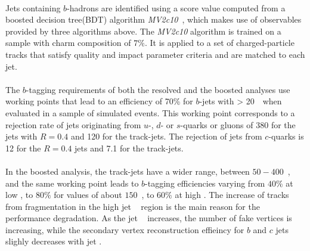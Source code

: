 \paragraph{}
Jets containing $b$-hadrons are identified using a score value computed from a boosted decision tree(BDT) algorithm \emph{MV2c10}~\cite{btaggingRun2, Aad:2015ydr}, which makes use of observables provided by three algorithms above. The \emph{MV2c10} algorithm is trained on a sample with charm composition of $7\%$. It is applied to a set of charged-particle tracks that satisfy quality and impact parameter criteria and are matched to each jet. 

\paragraph{}
The $b$-tagging requirements of both the resolved and the boosted analyses use working points that lead to an efficiency of 70\% for $b$-jets with \pt > 20~\GeV\ when evaluated in a sample of simulated \ttbar events. This working point corresponds to a rejection rate of jets originating from $u$-, $d$- or $s$-quarks or gluons of 380 for the jets with $R=0.4$ and 120 for the track-jets. The rejection of jets from $c$-quarks is 12 for the $R=0.4$ jets and 7.1 for the track-jets.

\paragraph{}
In the boosted analysis, the track-jets have a wider \pt range, between $50-400$~\GeV, and the same working point leads to $b$-tagging efficiencies varying from $40\%$ at low \pt, to $80\%$ for \pt values of about $150$~\GeV, to $60\%$ at high \pt.
The increase of tracks from fragmentation in the high jet \pt~ region is the main reason for the performance degradation. As the jet \pt~ increases, the number of fake vertices is increasing, while the secondary vertex reconstruction effieincy for $b$ and $c$ jets slighly decreases with jet \pt.


